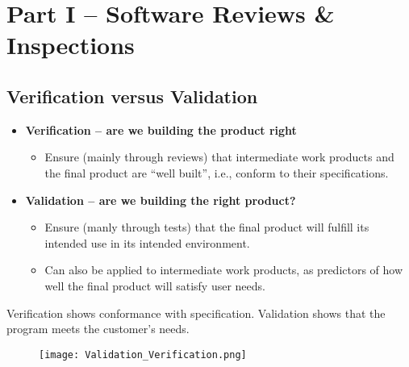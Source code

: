 \documentclass[../ESOF_notes.tex]{subfiles}
\begin{document}
\section{Part I – Software Reviews \& Inspections}
    \subsection{Verification versus Validation}
        \begin{itemize}
            \item \textbf{Verification – are we building the product right}
                \begin{itemize}
                    \item Ensure (mainly through reviews) that intermediate
                    work products and the final product are “well built”, 
                    i.e., conform to their specifications.
                \end{itemize}
            \item \textbf{Validation – are we building the right product?}
                \begin{itemize}
                    \item Ensure (manly through tests) that the final 
                    product will fulfill its intended use in its intended 
                    environment.
                    \item Can also be applied to intermediate work products, 
                    as predictors of how well the final product will satisfy 
                    user needs.
                \end{itemize}
        \end{itemize}
        Verification shows conformance with specification.
        Validation shows that the program meets the customer’s needs.
        \begin{figure}[h]
            \centering
            \texttt{[image: Validation\_Verification.png]}
        \end{figure}
\end{document}
